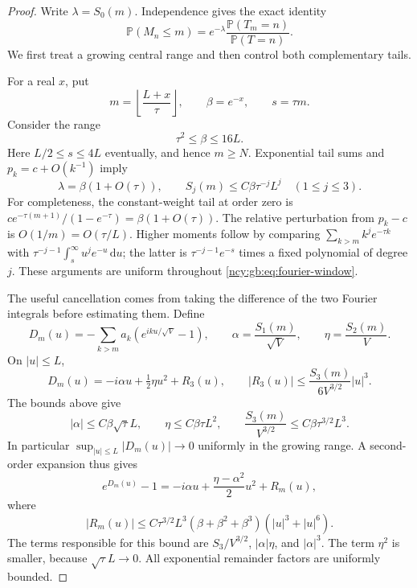 \documentclass[11pt,letterpaper]{article}
\numberwithin{equation}{section}
\theoremstyle{remark}\newtheorem{remark}[theorem]{Remark}
\newcommand{\dd}{\,\mathrm d}
\theoremstyle{definition}\newtheorem{definition}[theorem]{Definition}\theoremstyle{plain}
\newcommand{\Pbb}{\mathbb P}
\begin{document}
\begin{proof}
Write $\lambda=S_0(m)$.  Independence gives the exact identity
\begin{equation}
 \Pbb(M_n\leq m)
 =e^{-\lambda}\frac{\Pbb(T_m=n)}{\Pbb(T=n)}.
 \label{ncy:gb:eq:fourier-conditioning}
\end{equation}
We first treat a growing central range and then control both complementary
tails.

For a real $x$, put
\[
 m=\left\lfloor\frac{L+x}{\tau}\right\rfloor,
 \qquad \beta=e^{-x},\qquad s=\tau m.
\]
Consider the range
\begin{equation}
 \tau^2\leq\beta\leq16L.
 \label{ncy:gb:eq:fourier-window}
\end{equation}
Here $L/2\leq s\leq4L$ eventually, and hence $m\geq N$.  Exponential
tail sums and $p_k=c+O(k^{-1})$ imply
\begin{equation}
 \lambda=\beta(1+O(\tau)),\qquad
 S_j(m)\leq C\beta\tau^{-j}L^j\quad(1\leq j\leq3).
 \label{ncy:gb:eq:fourier-tailbounds}
\end{equation}
For completeness, the constant-weight tail at order zero is
$ce^{-\tau(m+1)}/(1-e^{-\tau})=\beta(1+O(\tau))$.  The relative
perturbation from $p_k-c$ is $O(1/m)=O(\tau/L)$.  Higher moments follow
by comparing $\sum_{k>m}k^je^{-\tau k}$ with
$\tau^{-j-1}\int_s^\infty u^je^{-u}\dd u$; the latter is
$\tau^{-j-1}e^{-s}$ times a fixed polynomial of degree $j$.  These
arguments are uniform throughout \eqref{ncy:gb:eq:fourier-window}.

The useful cancellation comes from taking the difference of the two
Fourier integrals before estimating them.  Define
\[
 D_m(u)=-\sum_{k>m}a_k(e^{iku/\sqrt V}-1),\qquad
 \alpha=\frac{S_1(m)}{\sqrt V},\qquad
 \eta=\frac{S_2(m)}V.
\]
On $|u|\leq L$,
\[
 D_m(u)=-i\alpha u+\tfrac12\eta u^2+R_3(u),
 \qquad
 |R_3(u)|\leq\frac{S_3(m)}{6V^{3/2}}|u|^3.
\]
The bounds above give
\[
 |\alpha|\leq C\beta\sqrt\tau L,\qquad
 \eta\leq C\beta\tau L^2,\qquad
 \frac{S_3(m)}{V^{3/2}}\leq C\beta\tau^{3/2}L^3.
\]
In particular $\sup_{|u|\leq L}|D_m(u)|\to0$ uniformly in the growing
range.  A second-order expansion thus gives
\begin{equation}
 e^{D_m(u)}-1
 =-i\alpha u+\frac{\eta-\alpha^2}{2}u^2+R_m(u),
 \label{ncy:gb:eq:fourier-tailperturb}
\end{equation}
where
\[
 |R_m(u)|\leq C\tau^{3/2}L^3
 (\beta+\beta^2+\beta^3)(|u|^3+|u|^6).
\]
The terms responsible for this bound are $S_3/V^{3/2}$,
$|\alpha|\eta$, and $|\alpha|^3$.  The term $\eta^2$ is smaller,
because $\sqrt\tau L\to0$.  All exponential remainder factors are
uniformly bounded.


\end{proof}
\end{document}
